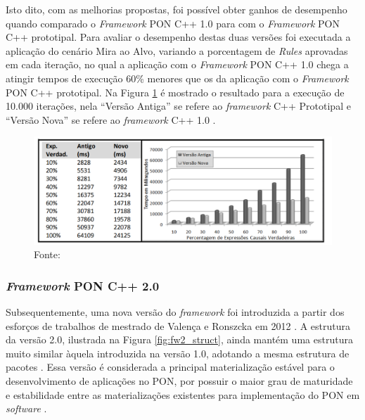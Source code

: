 Isto dito, com as melhorias propostas, foi possível obter ganhos de desempenho
quando comparado o \textit{Framework} PON C++ 1.0  para com o \textit{Framework}
PON C++ prototipal. Para avaliar o desempenho destas duas versões foi executada
a aplicação do cenário Mira ao Alvo, variando a porcentagem de \textit{Rules}
aprovadas em cada iteração, no qual a aplicação com o \textit{Framework} PON C++
1.0 chega a atingir tempos de execução 60\% menores que os da aplicação com o
\textit{Framework} PON C++ prototipal. Na Figura \ref{fig:fw1_vs_prot} é
mostrado o resultado para a execução de 10.000 iterações, nela \enquote{Versão Antiga}
se refere ao \textit{framework} C++ Prototipal e \enquote{Versão Nova} se refere ao
\textit{framework} C++ 1.0 \cite{msc_Banaszewski_2009}.

\begin{figure}[!htb]
  \centering
  \caption{Comparação do desempenho do \textit{framework} C++ 1.0 com o
  \textit{framework} C++ Prototipal} \includegraphics[width=\textwidth]{../figures/fw1_vs_prot.png}
  \caption*{Fonte:
  }
  \label{fig:fw1_vs_prot}
\end{figure}

\FloatBarrier

\subsubsection{\textit{Framework} PON C++ 2.0}\label{sec:fw2_revisao}

Subsequentemente, uma nova versão do \textit{framework} foi introduzida a partir
dos esforços de trabalhos de mestrado de Valença e Ronszcka em 2012
\cite{msc_valenca_2012,msc_Ronszcka_2012}. A estrutura da versão 2.0, ilustrada
na Figura \ref{fig:fw2_struct}, ainda mantém uma estrutura muito similar àquela
introduzida na versão 1.0, adotando a mesma estrutura de pacotes
\cite{msc_Ronszcka_2012}. Essa versão é considerada a principal materialização
estável para o desenvolvimento de aplicações no PON, por possuir o maior grau de
maturidade e estabilidade entre as materializações existentes para implementação
do PON em \textit{software} \cite{doc_ronszcka_2019}.

